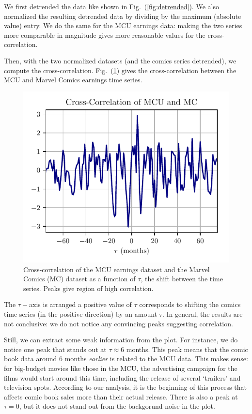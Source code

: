 \documentclass[12pt]{article}
\begin{document}
We first detrended the data like shown in Fig.~(\ref{fig:detrended}).  We also normalized the resulting detrended data by dividing by the maximum (absolute value) entry.  We do the same for the MCU earnings data: making the two series more comparable in magnitude gives more reasonable values for the cross-correlation.

Then, with the two normalized datasets (and the comics series detrended), we compute the cross-correlation. Fig.~(\ref{fig:correlation1}) gives the cross-correlation between the MCU and Marvel Comics earnings time series.
\begin{figure}[h]
    \centering
    \includegraphics{figures/correlation1.pdf}
    \caption{Cross-correlation of the MCU earnings dataset and the Marvel Comics (MC) dataset as a function of $\tau$, the shift between the time series.  Peaks give region of high correlation.}\label{fig:correlation1}
\end{figure}
The $\tau-$axis is arranged a positive value of $\tau$ corresponds to shifting the comics time series (in the positive direction) by an amount $\tau$.  In general, the results are not conclusive: we do not notice any convincing peaks suggesting correlation.

Still, we can extract some weak information from the plot.  For instance, we do notice one peak that stands out at $\tau\approx 6$ months.  This peak means that the comic book data around 6 months \textit{earlier} is related to the MCU data.  This makes sense: for big-budget movies like those in the MCU, the advertising campaign for the films would start around this time, including the release of several `trailers' and television spots.  According to our analysis, it is the beginning of this process that affects comic book sales more than their actual release.  There is also a peak at $\tau = 0$, but it does not stand out from the backgorund noise in the plot.
\end{document}
